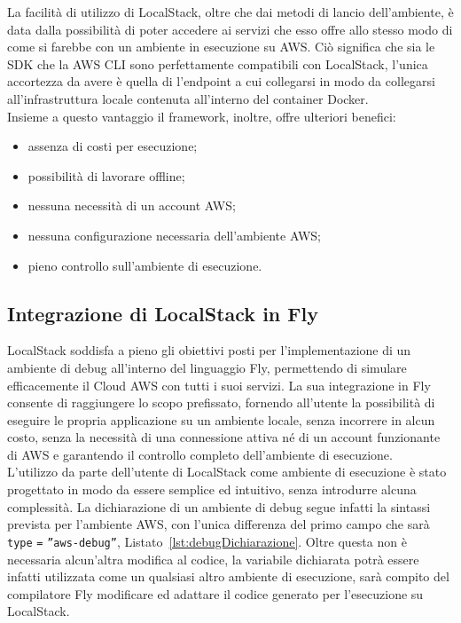 La facilità di utilizzo di LocalStack, oltre che dai metodi di lancio dell'ambiente, è data dalla possibilità di poter accedere ai servizi che esso offre allo stesso modo di come si farebbe con un ambiente in esecuzione su AWS. Ciò significa che sia le SDK \cite{awsSDK} che la AWS CLI \cite{awsCLI} sono perfettamente compatibili con LocalStack, l'unica accortezza da avere è quella di l'endpoint a cui collegarsi in modo da collegarsi all'infrastruttura locale contenuta all'interno del container Docker.\\
Insieme a questo vantaggio il framework, inoltre, offre ulteriori benefici:

\begin{itemize}
    \item assenza di costi per esecuzione;
    \item possibilità di lavorare offline;
    \item nessuna necessità di un account AWS;
    \item nessuna configurazione necessaria dell'ambiente AWS;
    \item pieno controllo sull'ambiente di esecuzione.
\end{itemize}

\subsection{Integrazione di LocalStack in Fly}
LocalStack soddisfa a pieno gli obiettivi posti per l’implementazione di un ambiente di debug all’interno del linguaggio Fly, permettendo di simulare efficacemente il Cloud AWS con tutti i suoi servizi. La sua integrazione in Fly consente di raggiungere lo scopo prefissato, fornendo all’utente la possibilità di eseguire le propria applicazione su un ambiente locale, senza incorrere in alcun costo, senza la necessità di una connessione attiva né di un account funzionante di AWS e garantendo il controllo completo dell’ambiente di esecuzione.\\
L'utilizzo da parte dell'utente di LocalStack come ambiente di esecuzione è stato progettato in modo da essere semplice ed intuitivo, senza introdurre alcuna complessità. La dichiarazione di un ambiente di debug segue infatti la sintassi prevista per l’ambiente AWS, con l'unica differenza del primo campo che sarà \verb|type| \verb|=| \verb|”aws-debug”|, Listato~\ref{lst:debugDichiarazione}. Oltre questa non è necessaria alcun'altra modifica al codice, la variabile dichiarata potrà essere infatti utilizzata come un qualsiasi altro ambiente di esecuzione, sarà compito del compilatore Fly modificare ed adattare il codice generato per l'esecuzione su LocalStack.\\

